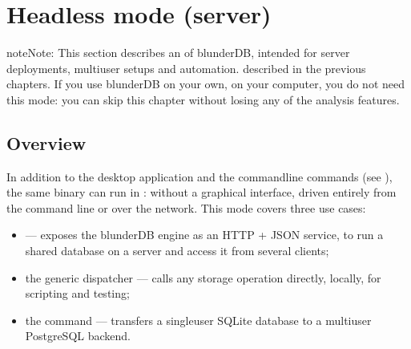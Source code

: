 \documentclass[letterpaper,10pt,english]{sphinxmanual}
\begin{document}
\sphinxstepscope


\section{Headless mode (server)}
\label{\detokenize{mode_headless:mode-headless-serveur}}\label{\detokenize{mode_headless:headless}}\label{\detokenize{mode_headless::doc}}
\begin{sphinxadmonition}{note}{Note:}
\sphinxAtStartPar
This section describes an  of blunderDB, intended for server deployments, multi\sphinxhyphen{}user setups and automation.  described in the previous chapters. If you use blunderDB on your own, on your computer, you do not need this mode: you can skip this chapter without losing any of the analysis features.
\end{sphinxadmonition}


\subsection{Overview}
\label{\detokenize{mode_headless:vue-d-ensemble}}
\sphinxAtStartPar
In addition to the desktop application and the command\sphinxhyphen{}line commands (see {\hyperref[\detokenize{cli:cli}]{}}), the same  binary can run in : without a graphical interface, driven entirely from the command line or over the network. This mode covers three use cases:
\begin{itemize}
\item {} 
\sphinxAtStartPar
{}   — exposes the blunderDB engine as an HTTP + JSON service, to run a shared database on a server and access it from several clients;

\item {} 
\sphinxAtStartPar
the generic  dispatcher — calls any storage operation directly, locally, for scripting and testing;

\item {} 
\sphinxAtStartPar
the  command — transfers a single\sphinxhyphen{}user SQLite database to a multi\sphinxhyphen{}user PostgreSQL backend.

\end{itemize}
\end{document}
